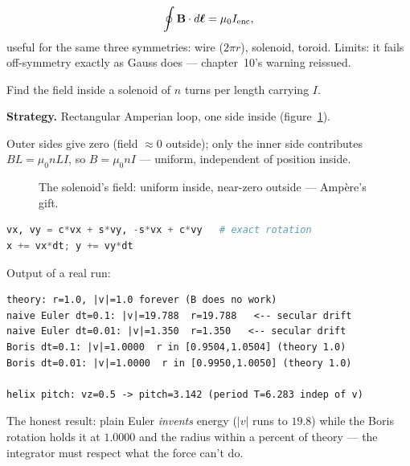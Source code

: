 \begin{equation}
  \oint\mathbf B\cdot d\boldsymbol\ell=\mu_0I_{\rm enc},\label{eq:amp}
\end{equation}
useful for the same three symmetries: wire ($2\pi r$), solenoid,
toroid. Limits: it fails off-symmetry exactly as Gauss does ---
chapter~10's warning reissued.

\begin{example}\label{ex:sol}
Find the field inside a solenoid of $n$ turns per length carrying $I$.
\par\smallskip
\textbf{Strategy.} Rectangular Amperian loop, one side inside
(figure~\ref{fig:sol}).
\begin{solution}
Outer sides give zero (field $\approx0$ outside); only the inner side
contributes $BL=\mu_0nLI$, so $B=\mu_0nI$ --- uniform, independent of
position inside. \checkmark
\end{solution}
\end{example}

\begin{figure}[htbp]\centering

\caption{The solenoid's field: uniform inside, near-zero outside ---
Amp\`ere's gift.}
\label{fig:sol}
\end{figure}

\begin{lstlisting}[language=Python,caption={\texttt{code/ch13\_lorentz\_orbit.py} --- naive Euler vs Boris rotation in $q\mathbf v\times\mathbf B$.},label={lst:lor}]
vx, vy = c*vx + s*vy, -s*vx + c*vy   # exact rotation
x += vx*dt; y += vy*dt
\end{lstlisting}

Output of a real run:
\begin{lstlisting}[numbers=none]
theory: r=1.0, |v|=1.0 forever (B does no work)
naive Euler dt=0.1: |v|=19.788  r=19.788   <-- secular drift
naive Euler dt=0.01: |v|=1.350  r=1.350   <-- secular drift
Boris dt=0.1: |v|=1.0000  r in [0.9504,1.0504] (theory 1.0)
Boris dt=0.01: |v|=1.0000  r in [0.9950,1.0050] (theory 1.0)

helix pitch: vz=0.5 -> pitch=3.142 (period T=6.283 indep of v)
\end{lstlisting}

The honest result: plain Euler \emph{invents} energy ($|v|$ runs to
$19.8$) while the Boris rotation holds it at $1.0000$ and the radius
within a percent of theory --- the integrator must respect what the
force can't do.

